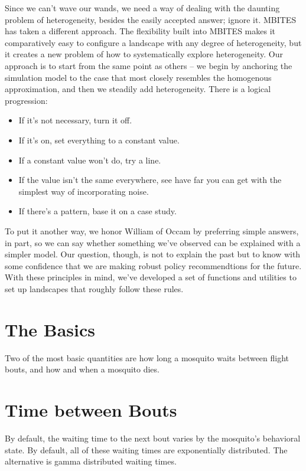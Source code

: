 \documentclass{article}
\begin{document}
Since we can't wave our wands, we need a way of dealing with the daunting problem of heterogeneity, besides the easily accepted answer; ignore it. MBITES has taken a different approach. The flexibility built into MBITES makes it comparatively easy to configure a landscape with any degree of heterogeneity, but it creates a new problem of how to systematically explore heterogeneity.  Our approach is to start from the same point as others -- we begin by anchoring the simulation model to the case that most closely resembles the homogenous approximation, and then we steadily add heterogeneity. There is a logical progression: 
\begin{itemize}
\item If it's not necessary, turn it off. 
\item If it's on, set everything to a constant value. 
\item If a constant value won't do, try a line. 
\item If the value isn't the same everywhere, see have far you can get with the simplest way of incorporating noise.
\item If there's a pattern, base it on a case study.  
\end{itemize}
To put it another way, we honor William of Occam by preferring simple answers, in part, so we can say whether something we've observed can be explained with a simpler model. Our question, though, is not to explain the past but to know with some confidence that we are making robust policy recommendtions for the future. With these principles in mind, we've developed a set of functions and utilities to set up landscapes that roughly follow these rules. 

\section{The Basics}

Two of the most basic quantities are how long a mosquito waits between flight bouts, and how and when a mosquito dies. 

\section{Time between Bouts}

By default, the waiting time to the next bout varies by the mosquito's behavioral state. By default, all of these waiting times are exponentially distributed. The alternative is gamma distributed waiting times. 
\end{document}
